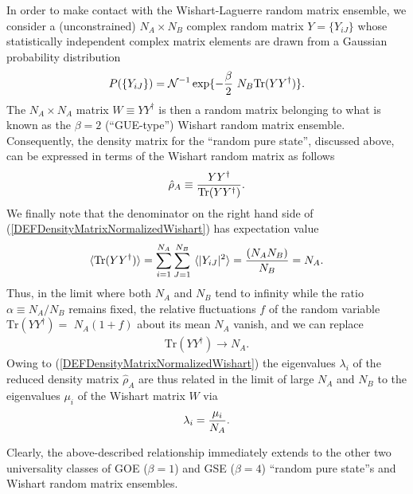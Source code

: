 \documentclass[aps,prb,preprint,onecolumn,amsmath,amssymb,superscriptaddress,eqsecnum,floatfix,scrartcl]{revtex4-1}
\begin{document}
In order to make contact with the Wishart-Laguerre random matrix ensemble, we consider a (unconstrained) 
$N_A\times N_B$ complex  random matrix $Y=\{Y_{iJ}\}$ whose statistically independent complex  matrix elements are drawn from a Gaussian 
probability distribution
\begin{eqnarray}
\label{WishartGaussianDistribution}
P(\{Y_{iJ}\})
=
{\cal N}^{-1}
\exp  \{ - {\beta\over 2} \  N_B \mbox{Tr}(Y Y^\dagger) \}.
\end{eqnarray}
The $N_A\times N_A$ matrix $W\equiv YY^\dagger$ is then a random matrix belonging to what is known as the $\beta=2$ 
(``GUE-type'') Wishart
random matrix ensemble. Consequently, the density matrix for the ``random pure state'', discussed above, can  be expressed in terms of the Wishart
random matrix as follows
\begin{eqnarray}
\label{DEFDensityMatrixNormalizedWishart}
{\hat  \rho}_A \equiv {Y Y^\dagger
\over \mbox{Tr} (Y Y^\dagger)}.
\end{eqnarray}
We finally note that the denominator on the right hand side of (\ref{DEFDensityMatrixNormalizedWishart}) has
expectation value
\begin{eqnarray}
\label{ExpectationValueTraceW}
\langle \mbox{Tr} (Y Y^\dagger)\rangle = 
\sum_{i=1}^{N_A}\sum_{J=1}^{N_B} \ 
\langle |Y_{iJ}|^2\rangle
={(N_A N_B)\over N_B} = N_A.
\end{eqnarray}
Thus,
 in the limit where both $N_A$ and $N_B$ tend to infinity while the ratio $\alpha\equiv N_A/N_B$ remains fixed, the relative fluctuations $f$
of the random variable $ \mbox{Tr} (Y Y^\dagger)=$ $N_A (1+ f)$ about its mean $N_A$ vanish, and we can replace 
\begin{eqnarray}
\label{LimitTrYYdagNA}
\mbox{Tr} (Y Y^\dagger) \to N_A.
\end{eqnarray}
Owing to (\ref{DEFDensityMatrixNormalizedWishart})
the eigenvalues $\lambda_i$ of the reduced density
matrix ${\hat \rho}_A$ are thus  related in the  limit of large $N_A$ and $N_B$ to the eigenvalues $\mu_i$ of the Wishart matrix $W$
via
\begin{eqnarray}
\label{DEFEigenvaluesOfRhoA}
\lambda_i = {\mu_i\over N_A}.
\end{eqnarray}



Clearly, the above-described relationship 
 immediately extends to the other two universality  classes of GOE ($\beta=1$) and GSE ($\beta=4$) ``random pure state''s and Wishart random matrix ensembles.
\end{document}

